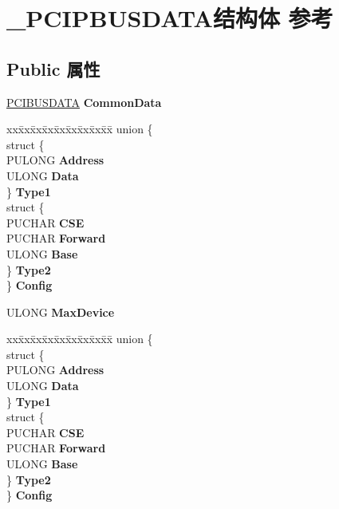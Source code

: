 \hypertarget{struct___p_c_i_p_b_u_s_d_a_t_a}{}\section{\+\_\+\+P\+C\+I\+P\+B\+U\+S\+D\+A\+T\+A结构体 参考}
\label{struct___p_c_i_p_b_u_s_d_a_t_a}
\subsection*{Public 属性}
\begin{DoxyCompactItemize}
\item 
\mbox{\label{struct___p_c_i_p_b_u_s_d_a_t_a_a7b480900246cce50f7bc7c653661a84d}} 
\hyperlink{struct___p_c_i_b_u_s_d_a_t_a}{P\+C\+I\+B\+U\+S\+D\+A\+TA} {\bfseries Common\+Data}
\item 
\mbox{\label{struct___p_c_i_p_b_u_s_d_a_t_a_a025eecfb5eb793d39b9e53a8cdcc7769}} 
\begin{tabbing}
xx\=xx\=xx\=xx\=xx\=xx\=xx\=xx\=xx\=\kill
union \{\\
\>struct \{\\
\>\>PULONG {\bfseries Address}\\
\>\>ULONG {\bfseries Data}\\
\>\} {\bfseries Type1}\\
\>struct \{\\
\>\>PUCHAR {\bfseries CSE}\\
\>\>PUCHAR {\bfseries Forward}\\
\>\>ULONG {\bfseries Base}\\
\>\} {\bfseries Type2}\\
\} {\bfseries Config}\\

\end{tabbing}\item 
\mbox{\label{struct___p_c_i_p_b_u_s_d_a_t_a_a8d23093e817b2f9d67d9062e2800f9b5}} 
U\+L\+O\+NG {\bfseries Max\+Device}
\item 
\mbox{\label{struct___p_c_i_p_b_u_s_d_a_t_a_a1ef6595abe4fd38678d6f15178eed5a5}} 
\begin{tabbing}
xx\=xx\=xx\=xx\=xx\=xx\=xx\=xx\=xx\=\kill
union \{\\
\>struct \{\\
\>\>PULONG {\bfseries Address}\\
\>\>ULONG {\bfseries Data}\\
\>\} {\bfseries Type1}\\
\>struct \{\\
\>\>PUCHAR {\bfseries CSE}\\
\>\>PUCHAR {\bfseries Forward}\\
\>\>ULONG {\bfseries Base}\\
\>\} {\bfseries Type2}\\
\} {\bfseries Config}\\


\end{tabbing}
\end{DoxyCompactItemize}
